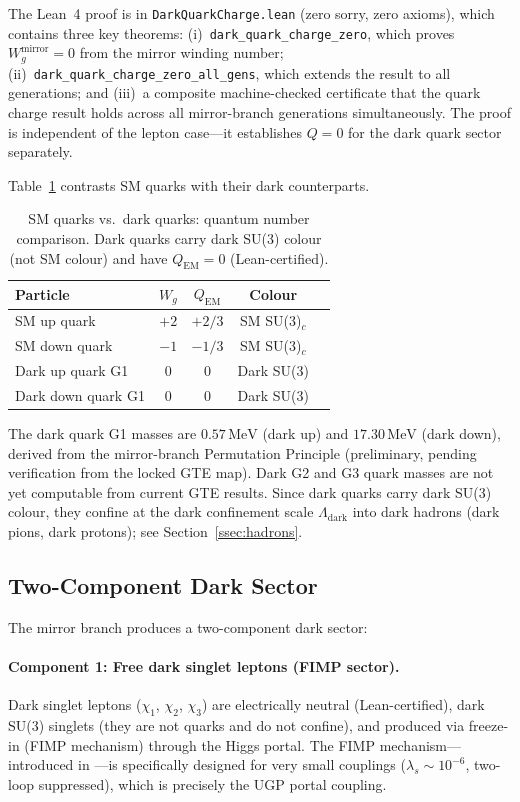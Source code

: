 \documentclass[11pt]{article}
\begin{document}
The Lean~4 proof is in \texttt{DarkQuarkCharge.lean} (zero sorry, zero axioms),
which contains three key theorems: (i)~\texttt{dark\_quark\_charge\_zero}, which proves
$W_g^\mathrm{mirror}=0$ from the mirror winding number; (ii)~\texttt{dark\_quark\_charge\_zero\_all\_gens},
which extends the result to all generations; and (iii)~a composite
machine-checked certificate that the quark charge result holds across all mirror-branch
generations simultaneously. The proof is independent
of the lepton case---it establishes $Q=0$ for the dark quark sector separately.

Table~\ref{tab:quark_comparison} contrasts SM quarks with their dark counterparts.

\begin{table}[H]
\centering
\caption{SM quarks vs.\ dark quarks: quantum number comparison. Dark quarks carry dark
SU(3) colour (not SM colour) and have $Q_\mathrm{EM}=0$ (Lean-certified).}
\label{tab:quark_comparison}
\begin{tabular}{lcccc}
\toprule
Particle & $W_g$ & $Q_\mathrm{EM}$ & Colour \\
\midrule
SM up quark   & $+2$ & $+2/3$ & SM SU(3)$_c$ \\
SM down quark & $-1$ & $-1/3$ & SM SU(3)$_c$ \\
Dark up quark G1   & $0$ & $0$ & Dark SU(3) \\
Dark down quark G1 & $0$ & $0$ & Dark SU(3) \\
\bottomrule
\end{tabular}
\end{table}

The dark quark G1 masses are $0.57\,\mathrm{MeV}$ (dark up) and $17.30\,\mathrm{MeV}$
(dark down), derived from the mirror-branch Permutation Principle (preliminary, pending
verification from the locked GTE map). Dark G2 and G3 quark masses are not yet
computable from current GTE results. Since dark quarks carry dark SU(3) colour, they
confine at the dark confinement scale $\Lambda_\mathrm{dark}$ into dark hadrons (dark
pions, dark protons); see Section~\ref{ssec:hadrons}.

\subsection{Two-Component Dark Sector}
\label{ssec:two_component}

The mirror branch produces a two-component dark sector:

\paragraph{Component 1: Free dark singlet leptons (FIMP sector).}
Dark singlet leptons ($\chi_1$, $\chi_2$, $\chi_3$) are electrically neutral (Lean-certified),
dark SU(3) singlets (they are not quarks and do not confine), and produced via
freeze-in (FIMP mechanism) through the Higgs portal. The FIMP mechanism---introduced
in \cite{McDonald2002,HallFIMP2010}---is specifically designed for very small couplings
($\lambda_s \sim 10^{-6}$, two-loop suppressed), which is precisely the UGP portal coupling.
\end{document}
